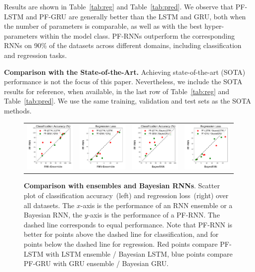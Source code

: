 \documentclass[letterpaper]{article} %
\begin{document}
Results are shown in Table~\ref{tab:reg} and Table~\ref{tab:pred}. We observe that PF-LSTM and PF-GRU are generally better than the LSTM and GRU, both when the number of parameters is comparable, as well as with the best hyper-parameters within the model class.
PF-RNNs outperform the corresponding RNNs on 90\% of the datasets across different domains, including classification and regression tasks.

\textbf{Comparison with the State-of-the-Art.} Achieving state-of-the-art (SOTA) performance is not the focus of this paper. Nevertheless, we include the SOTA results for reference, when available, in the last row of Table~\ref{tab:reg} and Table~\ref{tab:pred}. We use the same training, validation and test sets as the SOTA methods. 
\begin{figure}[!htb]
	\centering
	\begin{tabular}{c c c c} 
		\includegraphics[width=0.2\linewidth]{figs/classification.pdf} &
		\includegraphics[width=0.2\linewidth]{figs/regression.pdf}&
		\includegraphics[width=0.2\linewidth]{figs/classification_brnn.pdf} &
		\includegraphics[width=0.2\linewidth]{figs/regression_brnn.pdf}
	\end{tabular}
	\caption{\textbf{Comparison with ensembles and Bayesian RNNs}. Scatter plot of classification accuracy~(left) and regression loss~(right) over all datasets. The $x$-axis is the performance of an RNN ensemble or a Bayesian RNN, the $y$-axis is the performance of a PF-RNN. The dashed line corresponds to equal performance. Note that PF-RNN is better for points above the dashed line for classification, and for points below the dashed line for regression. Red points compare PF-LSTM with LSTM ensemble / Bayesian LSTM, blue points compare PF-GRU with GRU ensemble / Bayesian GRU. 
	}
	\label{fig:ensemble}
\end{figure}
\end{document}

